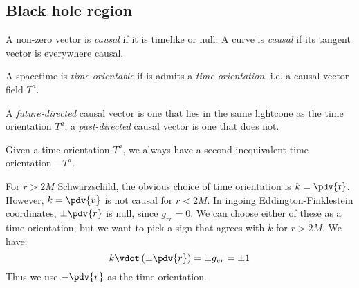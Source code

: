 \documentclass{jknotes}
\begin{document}
\subsection{Black hole region}
\begin{defn}
    A non-zero vector is \emph{causal} if it is timelike or null. A curve is \emph{causal} if its tangent vector is everywhere causal. 
\end{defn}
\begin{defn}
    A spacetime is \emph{time-orientable} if is admits a \emph{time orientation}, i.e. a causal vector field \(T^a\).
\end{defn}
\begin{defn}
    A \emph{future-directed} causal vector is one that lies in the same lightcone as the time orientation \(T^a\); a \emph{past-directed} causal vector is one that does not.
\end{defn}
Given a time orientation \(T^a\), we always have a second inequivalent time orientation \(-T^a\).

For \(r>2M\) Schwarzschild, the obvious choice of time orientation is \(k=\pdv{t}\). However, \(k=\pdv{v}\) is not causal for \(r<2M\). In ingoing Eddington-Finklestein coordinates, \(\pm\pdv{r}\) is null, since \(g_{rr} = 0\). We can choose either of these as a time orientation, but we want to pick a sign that agrees with \(k\) for \(r>2M\). We have:
\begin{equation}
    k\vdot\left( \pm \pdv{r} \right) = \pm g_{vr} = \pm 1
\end{equation}
Thus we use \(-\pdv{r}\) as the time orientation.
\end{document}

